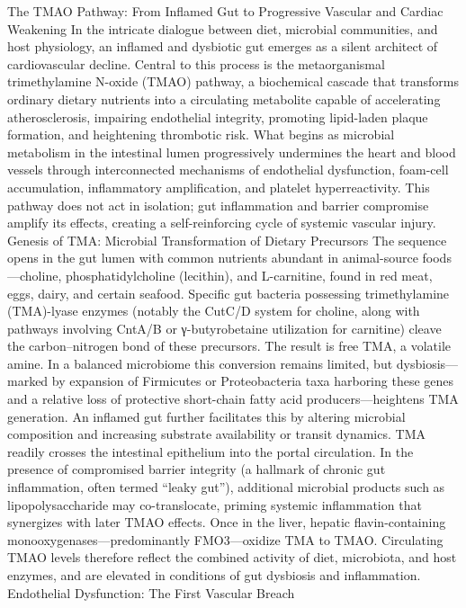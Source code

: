 The TMAO Pathway: From Inflamed Gut to Progressive Vascular and Cardiac Weakening
In the intricate dialogue between diet, microbial communities, and host physiology, an inflamed and dysbiotic gut emerges as a silent architect of cardiovascular decline. Central to this process is the metaorganismal trimethylamine N-oxide (TMAO) pathway, a biochemical cascade that transforms ordinary dietary nutrients into a circulating metabolite capable of accelerating atherosclerosis, impairing endothelial integrity, promoting lipid-laden plaque formation, and heightening thrombotic risk. What begins as microbial metabolism in the intestinal lumen progressively undermines the heart and blood vessels through interconnected mechanisms of endothelial dysfunction, foam-cell accumulation, inflammatory amplification, and platelet hyperreactivity. This pathway does not act in isolation; gut inflammation and barrier compromise amplify its effects, creating a self-reinforcing cycle of systemic vascular injury.
Genesis of TMA: Microbial Transformation of Dietary Precursors
The sequence opens in the gut lumen with common nutrients abundant in animal-source foods—choline, phosphatidylcholine (lecithin), and L-carnitine, found in red meat, eggs, dairy, and certain seafood. Specific gut bacteria possessing trimethylamine (TMA)-lyase enzymes (notably the CutC/D system for choline, along with pathways involving CntA/B or γ-butyrobetaine utilization for carnitine) cleave the carbon–nitrogen bond of these precursors. The result is free TMA, a volatile amine. In a balanced microbiome this conversion remains limited, but dysbiosis—marked by expansion of Firmicutes or Proteobacteria taxa harboring these genes and a relative loss of protective short-chain fatty acid producers—heightens TMA generation. An inflamed gut further facilitates this by altering microbial composition and increasing substrate availability or transit dynamics.
TMA readily crosses the intestinal epithelium into the portal circulation. In the presence of compromised barrier integrity (a hallmark of chronic gut inflammation, often termed “leaky gut”), additional microbial products such as lipopolysaccharide may co-translocate, priming systemic inflammation that synergizes with later TMAO effects. Once in the liver, hepatic flavin-containing monooxygenases—predominantly FMO3—oxidize TMA to TMAO. Circulating TMAO levels therefore reflect the combined activity of diet, microbiota, and host enzymes, and are elevated in conditions of gut dysbiosis and inflammation.
Endothelial Dysfunction: The First Vascular Breach
